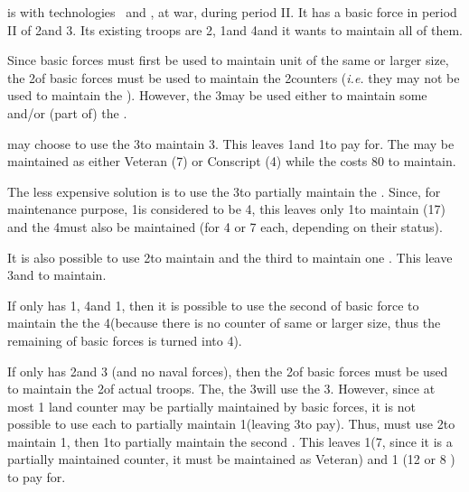 \begin{exemple}
  \SPA is with technologies \TREN\ and \TGLN, at war, during period II. It has
  a basic force in period II of 2\ARMY\faceplus and 3\GD. Its existing troops
  are 2\ARMY\faceplus, 1\FLEET\faceplus and 4\LD and it wants to maintain all
  of them.

  Since basic forces must first be used to maintain unit of the same or larger
  size, the 2\ARMY\Faceplus of basic forces must be used to maintain the
  2\ARMY\Faceplus counters (\emph{i.e.} they may not be used to maintain the
  \LD). However, the 3\GD may be used either to maintain some \LD and/or (part
  of) the \FLEET.

  \SPA may choose to use the 3\GD to maintain 3\LD. This leaves 1\LD and
  1\FLEET\Faceplus to pay for. The \LD may be maintained as either Veteran
  (7\ducats) or Conscript (4\ducats) while the \FLEET\Faceplus costs 80\ducats
  to maintain.

  The less expensive solution is to use the 3\GD to partially maintain the
  \FLEET. Since, for maintenance purpose, 1\FLEET\Faceplus is considered to be
  4\ND, this leaves only 1\ND to maintain (17\ducats) and the 4\LD must also
  be maintained (for 4 or 7 \ducats each, depending on their status).

  It is also possible to use 2\GD to maintain \FLEET\Facemoins and the third
  to maintain one \LD. This leave 3\LD and \FLEET\Facemoins to maintain.

  \smallskip

  If \SPA only has 1\ARMY\Faceplus, 4\LD and 1\FLEET\Faceplus, then it is
  possible to use the second \ARMY\faceplus of basic force to maintain the the
  4\LD (because there is no counter of same or larger size, thus the remaining
  \ARMY\Faceplus of basic forces is turned into 4\LD).

  \smallskip

  If \SPA only has 2\ARMY\Faceplus and 3 \ARMY\Facemoins (and no naval
  forces), then the 2\ARMY\Faceplus of basic forces must be used to maintain
  the 2\ARMY\Faceplus of actual troops. The, the 3\ARMY\Facemoins will use the
  3\GD. However, since at most 1 land counter may be partially maintained by
  basic forces, it is not possible to use each \GD to partially maintain
  1\ARMY\Facemoins (leaving 3\LD to pay). Thus, \SPA must use 2\GD to maintain
  1\ARMY\Facemoins, then 1\GD to partially maintain the second
  \ARMY\Facemoins. This leaves 1\LD (7\ducats, since it is a partially
  maintained counter, it must be maintained as Veteran) and 1\ARMY\Facemoins
  (12 or 8 \ducats) to pay for.
\end{exemple}

